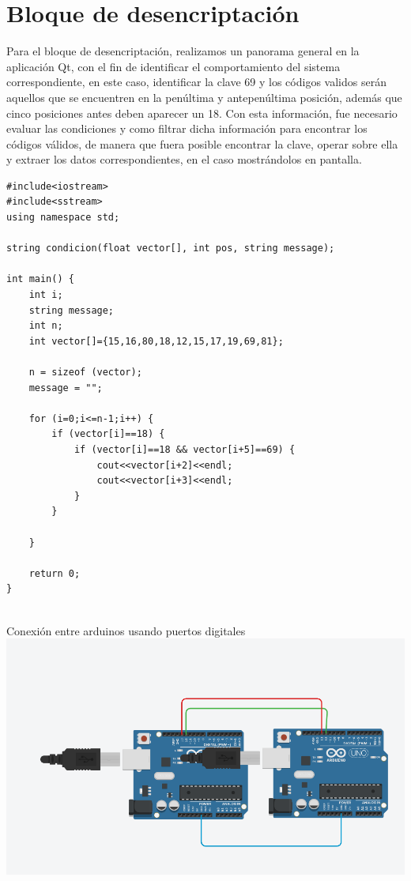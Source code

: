 \documentclass{article}
\begin{document}
\section{Bloque de desencriptación}
\label{Bloque de desencriptación}
\begin{justify}


Para el bloque de desencriptación, realizamos un panorama general en la aplicación Qt, con el fin de identificar el comportamiento del sistema correspondiente, en este caso, identificar la clave 69 y los códigos validos serán aquellos que se encuentren en la penúltima y antepenúltima posición, además que cinco posiciones antes deben aparecer un 18.
Con esta información, fue necesario evaluar las condiciones y como filtrar dicha información para encontrar los códigos válidos, de manera que fuera posible encontrar la clave, operar sobre ella y extraer los datos correspondientes, en el caso mostrándolos en pantalla.
\end{justify}
\begin{verbatim}
#include<iostream>
#include<sstream>
using namespace std;

string condicion(float vector[], int pos, string message);

int main() {
    int i;
    string message;
    int n;
    int vector[]={15,16,80,18,12,15,17,19,69,81};

    n = sizeof (vector);
    message = "";

    for (i=0;i<=n-1;i++) {
        if (vector[i]==18) {
            if (vector[i]==18 && vector[i+5]==69) {
                cout<<vector[i+2]<<endl;
                cout<<vector[i+3]<<endl;
            }
        }

    }
    
    return 0;
}


\end{verbatim}
\newpage
\centering Conexión entre arduinos usando puertos digitales\\
\includegraphics[scale=0.3]{figura6.png}\\
\end{document}
